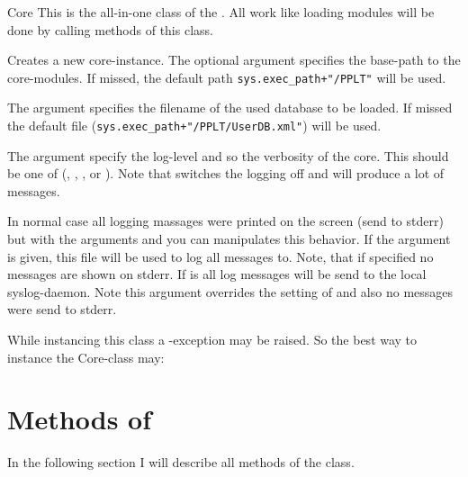 \begin{classdesc}{Core}{}
This is the all-in-one class of the . All work like loading 
modules will be done by calling methods of this class. 

Creates a new core-instance. The optional argument  specifies
the base-path to the core-modules. If missed, the default path 
\texttt{sys.exec\_path+"/PPLT"} will be used. 

The argument  specifies the filename of the used database to 
be loaded. If missed the default file 
(\texttt{sys.exec\_path+"/PPLT/UserDB.xml"}) will be used.


The argument  specify the log-level and so the verbosity of the 
core. This should be one of (, , , 
 or ). Note that  switches the logging
off and  will produce a lot of messages. 

In normal case all logging massages were printed on the screen (send to 
stderr) but with the arguments  and  you can 
manipulates this behavior. If the argument  is given, this file 
will be used to log all messages to. Note, that if  specified no 
messages are shown on stderr. If  is  all log messages 
will be send to the local syslog-daemon. Note this argument overrides the 
setting of  and also no messages were send to stderr.

While instancing this class a -exception may be raised. So the 
best way to instance the Core-class may:

\end{classdesc}

\section{Methods of }
\label{core-objects}
In the following section I will describe all methods of the  
class. 


